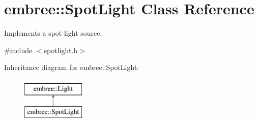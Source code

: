 \hypertarget{classembree_1_1_spot_light}{
\section{embree::SpotLight Class Reference}
\label{classembree_1_1_spot_light}
}


Implements a spot light source.  




{\ttfamily \#include $<$spotlight.h$>$}

Inheritance diagram for embree::SpotLight:\begin{figure}[H]
\begin{center}
\leavevmode
\includegraphics[height=2.000000cm]{classembree_1_1_spot_light}
\end{center}
\end{figure}

